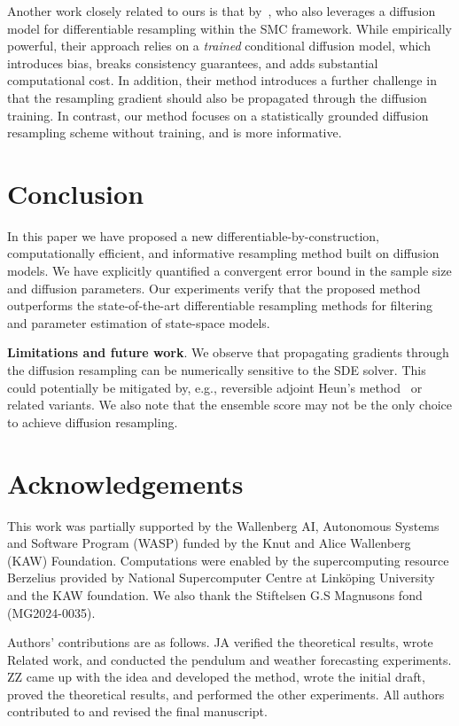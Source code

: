 \documentclass{article}
\begin{document}
Another work closely related to ours is that by~\citet{Wan2025diffpf}, who also leverages a diffusion model for differentiable resampling within the SMC framework. 
While empirically powerful, their approach relies on a \emph{trained} conditional
diffusion model, which introduces bias, breaks consistency guarantees, and adds substantial computational cost. 
In addition, their method introduces a further challenge in that the resampling gradient should also be propagated through the diffusion training. 
In contrast, our method focuses on a statistically grounded diffusion resampling scheme without training, and is more informative. 

\section{Conclusion}
\label{sec:conclusion}
In this paper we have proposed a new differentiable-by-construction, computationally efficient, and informative resampling method built on diffusion models. 
We have explicitly quantified a convergent error bound in the sample size and diffusion parameters. 
Our experiments verify that the proposed method outperforms the state-of-the-art differentiable resampling methods for filtering and parameter estimation of state-space models. 

\textbf{Limitations and future work}. 
We observe that propagating gradients through the diffusion resampling can be numerically sensitive to the SDE solver. 
This could potentially be mitigated by, e.g., reversible adjoint Heun's method~\citep{Kidger2021gradient} or related variants. 
We also note that the ensemble score may not be the only choice to achieve diffusion resampling.

\section*{Acknowledgements}
This work was partially supported by the Wallenberg AI, Autonomous Systems and Software Program (WASP) funded by the Knut and Alice Wallenberg (KAW) Foundation. 
Computations were enabled by the supercomputing resource Berzelius provided by National Supercomputer Centre at Link\"{o}ping University and the KAW foundation.
We also thank the Stiftelsen G.S Magnusons fond (MG2024-0035). 

Authors' contributions are as follows. 
JA verified the theoretical results, wrote Related work, and conducted the pendulum and weather forecasting experiments. 
ZZ came up with the idea and developed the method, wrote the initial draft, proved the theoretical results, and performed the other experiments. 
All authors contributed to and revised the final manuscript. 
\end{document}
